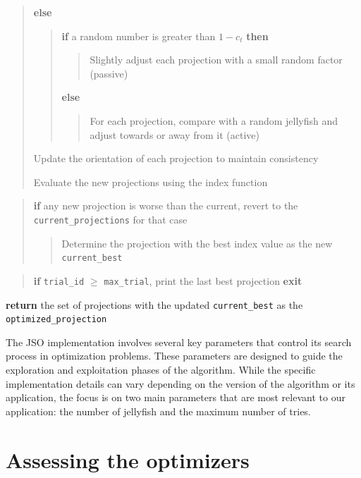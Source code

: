 \documentclass[
  12pt,
]{interact}
\theoremstyle{plain}
\begin{document}
\begin{tcolorbox}
\begin{quote}
\textbf{else}

\begin{quote}
\textbf{if} a random number is greater than \(1 - c_t\) \textbf{then}

\begin{quote}
Slightly adjust each projection with a small random factor (passive)
\end{quote}

\textbf{else}

\begin{quote}
For each projection, compare with a random jellyfish and adjust towards
or away from it (active)
\end{quote}
\end{quote}

Update the orientation of each projection to maintain consistency

Evaluate the new projections using the index function
\end{quote}

\begin{quote}
\textbf{if} any new projection is worse than the current, revert to the
\texttt{current\_projections} for that case

\begin{quote}
Determine the projection with the best index value as the new
\texttt{current\_best}
\end{quote}
\end{quote}

\begin{quote}
\textbf{if} \texttt{trial\_id} \(\ge\) \texttt{max\_trial}, print the
last best projection \textbf{exit}
\end{quote}

\textbf{return} the set of projections with the updated
\texttt{current\_best} as the \texttt{optimized\_projection}

\end{tcolorbox}

The JSO implementation involves several key parameters that control its
search process in optimization problems. These parameters are designed
to guide the exploration and exploitation phases of the algorithm. While
the specific implementation details can vary depending on the version of
the algorithm or its application, the focus is on two main parameters
that are most relevant to our application: the number of jellyfish and
the maximum number of tries.

\section{Assessing the optimizers}\label{sec-sim-deets}
\end{document}
